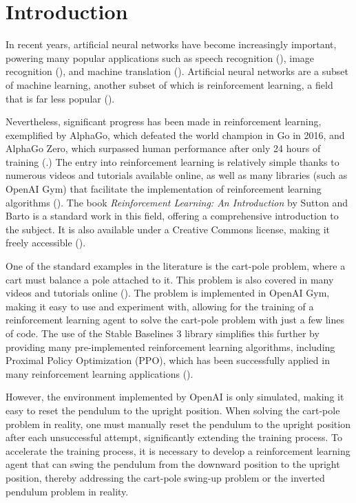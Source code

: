 \chapter{Introduction}

In recent years, artificial neural networks have become increasingly important, powering many popular applications such as speech recognition (\cite{deng_new_2013}), image recognition (\cite{rowley_neural_1998}), and machine translation (\cite{zhang_deep_2015,bengio_practical_2012}). Artificial neural networks are a subset of machine learning, another subset of which is reinforcement learning, a field that is far less popular (\cite{jordan_machine_2015}).

Nevertheless, significant progress has been made in reinforcement learning, exemplified by AlphaGo, which defeated the world champion in Go in 2016, and AlphaGo Zero, which surpassed human performance after only 24 hours of training (\cite{google_deepmind_alphago_2020,silver_mastering_2016,silver_mastering_2017}.) The entry into reinforcement learning is relatively simple thanks to numerous videos and tutorials available online, as well as many libraries (such as OpenAI Gym) that facilitate the implementation of reinforcement learning algorithms (\cite{nicholas_renotte_reinforcement_2021,raffin_stable-baselines3_2024,sentdex_q_2019}). The book \textit{Reinforcement Learning: An Introduction} by Sutton and Barto is a standard work in this field, offering a comprehensive introduction to the subject. It is also available under a Creative Commons license, making it freely accessible (\cite{sutton_reinforcement_2018}).

One of the standard examples in the literature is the cart-pole problem, where a cart must balance a pole attached to it. This problem is also covered in many videos and tutorials online (\cite{sutton_reinforcement_2018}). The problem is implemented in OpenAI Gym, making it easy to use and experiment with, allowing for the training of a reinforcement learning agent to solve the cart-pole problem with just a few lines of code. The use of the Stable Baselines 3 library simplifies this further by providing many pre-implemented reinforcement learning algorithms, including Proximal Policy Optimization (PPO), which has been successfully applied in many reinforcement learning applications (\cite{arxiv_insights_introduction_2018}).

However, the environment implemented by OpenAI is only simulated, making it easy to reset the pendulum to the upright position. When solving the cart-pole problem in reality, one must manually reset the pendulum to the upright position after each unsuccessful attempt, significantly extending the training process. To accelerate the training process, it is necessary to develop a reinforcement learning agent that can swing the pendulum from the downward position to the upright position, thereby addressing the cart-pole swing-up problem or the inverted pendulum problem in reality.

